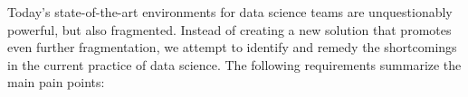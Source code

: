 


Today's state-of-the-art environments for data science teams are unquestionably
powerful, but also fragmented. Instead of creating a new solution that promotes
even further fragmentation, we attempt to identify and remedy the shortcomings
in the current practice of data science. The following requirements summarize
the main pain points:

